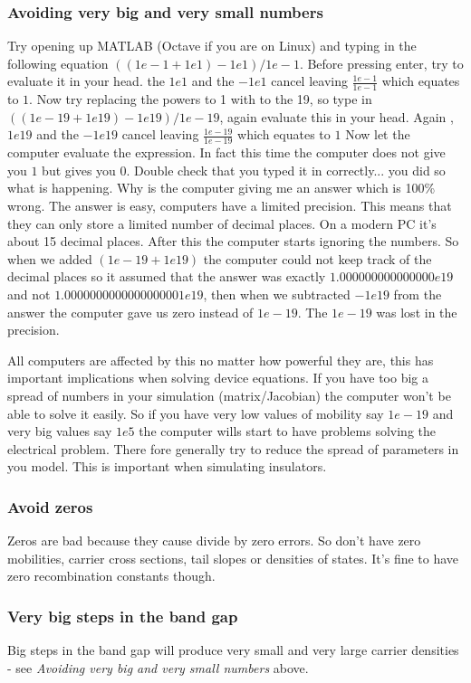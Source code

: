 \subsubsection{Avoiding very big and very small numbers}
Try opening up MATLAB (Octave if you are on Linux) and typing in the following equation $((1e-1+1e1)-1e1)/1e-1$. Before pressing enter, try to evaluate it in your head. the $1e1$ and the $-1e1$ cancel leaving $\frac{1e-1}{1e-1}$ which equates to $1$.  Now try replacing the powers to 1 with to the 19, so type in $((1e-19+1e19)-1e19)/1e-19$, again evaluate this in your head.  Again , $1e19$ and the $-1e19$ cancel leaving $\frac{1e-19}{1e-19}$ which equates to $1$  Now let the computer evaluate the expression.  In fact this time the computer does not give you $1$ but gives you $0$. Double check that you typed it in correctly... you did so what is happening. Why is the computer giving me an answer which is 100\% wrong.  The answer is easy, computers have a limited precision. This means that they can only store a limited number of decimal places. On a modern PC it's about 15 decimal places. After this the computer starts ignoring the numbers.  So when we added $(1e-19+1e19)$ the computer could not keep track of the decimal places so it assumed that the answer was exactly $1.000000000000000e19$ and not $1.0000000000000000001e19$, then when we subtracted $-1e19$ from the answer the computer gave us zero instead of $1e-19$.  The $1e-19$ was lost in the precision.

All computers are affected by this no matter how powerful they are, this has important implications when solving device equations.  If you have too big a spread of numbers in your simulation (matrix/Jacobian) the computer won't be able to solve it easily.  So if you have very low values of mobility say $1e-19$ and very big values say $1e5$ the computer wills start to have problems solving the electrical problem. There fore generally try to reduce the spread of parameters in you model. This is important when simulating insulators.

\subsubsection{Avoid zeros}
Zeros are bad because they cause divide by zero errors. So don't have zero mobilities, carrier cross sections, tail slopes or densities of states.  It's fine to have zero recombination constants though.

\subsubsection{Very big steps in the band gap}
Big steps in the band gap will produce very small and very large carrier densities - see \emph{Avoiding very big and very small numbers} above.

